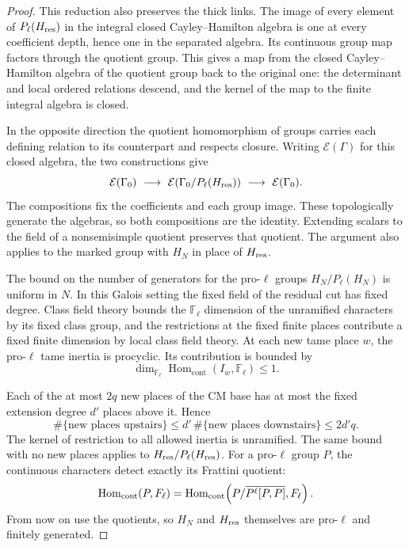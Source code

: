 \begin{proof}
This reduction also preserves the thick links. The image of every
element of \(P_\ell(H_{\rm res})\) in the integral closed
Cayley--Hamilton algebra is one at every coefficient depth, hence
one in the separated algebra. Its continuous group map factors
through the quotient group. This gives a map from the closed
Cayley--Hamilton algebra of the quotient group back to the original
one: the determinant and local ordered relations descend, and the
kernel of the map to the finite integral algebra is closed.

In the
opposite direction the quotient homomorphism of groups carries
each defining relation to its counterpart and respects closure.
Writing \(\mathcal E(\Gamma)\) for this closed algebra, the
two constructions give
\[
 \mathcal E(\Gamma_0)\ \longrightarrow\
 \mathcal E(\Gamma_0/P_\ell(H_{\rm res}))\
 \longrightarrow\ \mathcal E(\Gamma_0).
\]
The compositions fix the coefficients and each group image.
These topologically generate the algebras, so both compositions
are the identity. Extending scalars to the field of a nonsemisimple quotient preserves that quotient. The argument
also applies to the marked group with \(H_N\) in place of
\(H_{\rm res}\).

The bound on the number of generators for the pro-\(\ell\)
groups \(H_N/P_\ell(H_N)\) is uniform in \(N\).
In this Galois setting the fixed field of the residual cut has
fixed degree. Class field theory bounds the \(\mathbb F_\ell\)
dimension of the unramified characters by its fixed class group,
and the restrictions at the fixed finite places contribute a
fixed finite dimension by local class field theory. At each new tame place \(w\), the pro-\(\ell\) tame inertia is procyclic. Its contribution is bounded by 
\[
 \dim_{\mathbb F_\ell}\operatorname{Hom}_{\mathrm{cont}}(I_w,\mathbb F_\ell)\le1.
\]

Each of the at most \(2q\) new places of the CM base has at most the fixed extension degree \(d'\) places above it. Hence
\[
 \#\{\text{new places upstairs}\}\le d'\,\#\{\text{new places downstairs}\}\le 2d'q .
\]
The kernel of restriction to all allowed inertia is unramified.
The same bound with no new places applies to \(H_{\rm res}/P_\ell(H_{\rm res})\).
For a pro-\(\ell\) group \(P\), the continuous characters detect exactly its Frattini quotient: 
\[
 \operatorname{Hom}_{\rm cont}(P,\mathbb F_\ell)=\operatorname{Hom}_{\rm cont}\!\left(P/\overline{P^\ell[P,P]},\mathbb F_\ell\right).
\]
 From now on use the quotients, so \(H_N\) and \(H_{\rm res}\)
themselves are pro-\(\ell\) and finitely generated.


\end{proof}
